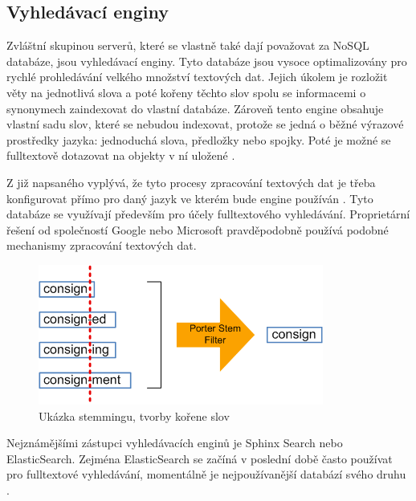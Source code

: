 \subsection{Vyhledávací enginy}
Zvláštní skupinou serverů, které se vlastně také dají považovat za NoSQL databáze, jsou vyhledávací enginy. Tyto databáze jsou vysoce optimalizovány pro rychlé prohledávání velkého množství textových dat. Jejich úkolem je rozložit věty na jednotlivá slova a poté kořeny těchto slov spolu se informacemi o synonymech zaindexovat do vlastní databáze. Zároveň tento engine obsahuje vlastní sadu slov, které se nebudou indexovat, protože se jedná o běžné výrazové prostředky jazyka: jednoduchá slova, předložky nebo spojky. Poté je  možné se fulltextově dotazovat na objekty v ní uložené \cite{searching}.

Z již napsaného vyplývá, že tyto procesy zpracování textových dat je třeba konfigurovat přímo pro daný jazyk ve kterém bude engine používán \cite{searching}. Tyto databáze se využívají především pro účely fulltextového vyhledávání. Proprietární řešení od společností Google nebo Microsoft pravděpodobně používá podobné mechanismy zpracování textových dat.
\begin{figure}[h]
\begin{centering}
\includegraphics[scale=0.9]{obrazky/stemming}
\par\end{centering}
\caption{Ukázka stemmingu, tvorby kořene slov \cite{grailsLucene}}
\end{figure}

Nejznámějšími zástupci vyhledávacích enginů je Sphinx Search nebo ElasticSearch. Zejména  ElasticSearch se začíná v poslední době často používat pro fulltextové vyhledávání, momentálně je nejpoužívanější databází svého druhu \cite{enginesRanking}.



